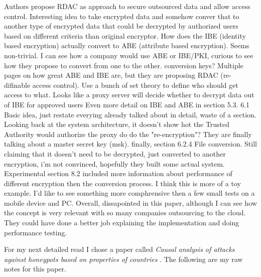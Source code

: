 \documentclass[conference]{IEEEtran}
\begin{document}
Authors propose RDAC as approach to secure outsourced data and allow access control. Interesting idea to take encrypted data and somehow conver that to another type of encrypted data that could be decrypted by authorized users based on different criteria than original encryptor.
How does the IBE (identity based encryption) actually convert to ABE (attribute based encryption). 
Seems non-trivial.
I can see how a company would use ABE or IBE/PKI, curious to see how they propose to convert from one to the other. 
conversion keys? Multiple pages on how great ABE and IBE are, but they are proposing RDAC (re-difinable access control). Use a bunch of set theory to define who should get access to what.
Looks like a proxy server will decide whether to decrypt data out of IBE for approved users
Even more detail on IBE and ABE in section 5.3.
6.1 Basic idea, just restate everying already talked about in detail, waste of a section.
Looking back at the system architecture, it doesn't show hot the Trusted Authority would authorize the proxy do do the "re-encryption"?
They are finally talking about a master secret key (msk). 
finally, section 6.2.4 File conversion.
Still claiming that it doesn't need to be decrypted, just converted to another encryption, i'm not convinced, hopefully they built some actual system.
Experimental section 8.2 included more information about performance of different encryption then the conversion process. 
I think this is more of a toy example. I'd like to see something more comphrensive then a few small tests on a mobile device and PC.
Overall, dissapointed in this paper, although I can see how the concept is very relevant with so many companies outsourcing to the cloud. 
They could have done a better job explaining the implementation and doing performance testing.


For my next detailed read I chose a paper called  \textit{Causal analysis of attacks against honeypots based on properties of countries} \cite{zuzcak_causal_2019}. The following are my raw notes for this paper.










\end{document}
